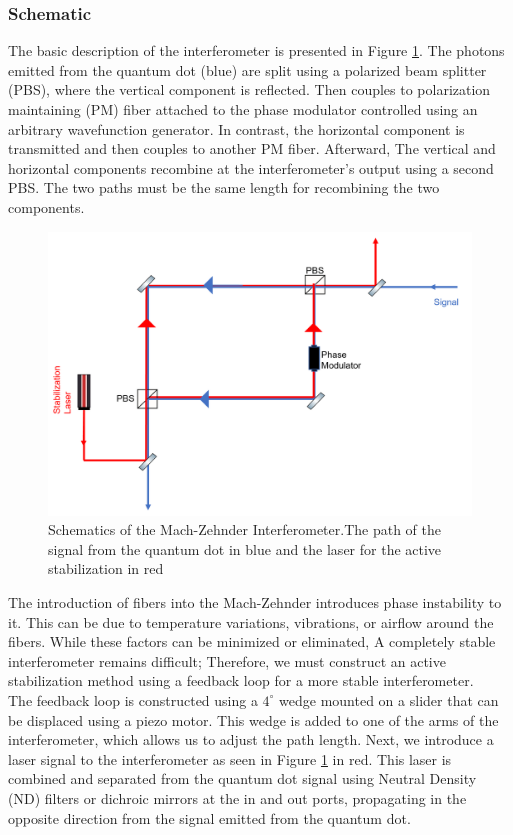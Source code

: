 \subsubsection{Schematic}
The basic description of the interferometer is presented in Figure \ref{fig:Mach_zhender}. The photons emitted from the quantum dot (blue) are split using a polarized beam splitter (PBS), where the vertical component is reflected. Then couples to polarization maintaining (PM) fiber attached to the phase modulator controlled using an arbitrary wavefunction generator. In contrast, the horizontal component is transmitted and then couples to another PM fiber. Afterward, The vertical and horizontal components recombine at the interferometer's output using a second PBS. The two paths must be the same length for recombining the two components.
\begin{figure}[H]
		\centering
		\includegraphics[scale=0.70]{figures/Mach_Zhender Interferometer.png}
		\caption{Schematics of the Mach-Zehnder Interferometer.The path of the signal from the quantum dot in blue and the laser for the active stabilization in red}
		\label{fig:Mach_zhender}
	\end{figure}
 The introduction of fibers into the Mach-Zehnder introduces phase instability to it. This can be due to temperature variations, vibrations, or airflow around the fibers. While these factors can be minimized or eliminated, A completely stable interferometer remains difficult; Therefore, we must construct an active stabilization method using a feedback loop for a more stable interferometer.\\
 The feedback loop is constructed using a $4^{\circ}$ wedge mounted on a slider that can be displaced using a piezo motor. This wedge is added to one of the arms of the interferometer, which allows us to adjust the path length. Next, we introduce a laser signal to the interferometer as seen in Figure \ref{fig:Mach_zhender} in red. This laser is combined and separated from the quantum dot signal using Neutral Density (ND) filters or dichroic mirrors at the in and out ports, propagating in the opposite direction from the signal emitted from the quantum dot. \\
